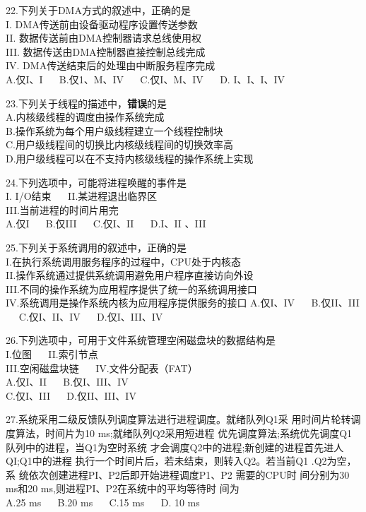 22.下列关于DMA方式的叙述中，正确的是 \\
I. DMA传送前由设备驱动程序设置传送参数 \\
II. 数据传送前由DMA控制器请求总线使用权 \\
III. 数据传送由DMA控制器直接控制总线完成 \\
IV. DMA传送结束后的处理由中断服务程序完成 \\
A.仅I、I $\quad$ B.仅1、M、IV $\quad$ C.仅I、M、IV $\quad$ D. I、I、I、IV

23.下列关于线程的描述中，\textbf{错误}的是 \\
A.内核级线程的调度由操作系统完成 \\
B.操作系统为每个用户级线程建立一个线程控制块 \\
C.用户级线程间的切换比内核级线程间的切换效率高 \\
D.用户级线程可以在不支持内核级线程的操作系统上实现

24.下列选项中，可能将进程唤醒的事件是 \\
I. I/O结束 $\quad$ II.某进程退出临界区 \\
III.当前进程的时间片用完 \\
A.仅I $\quad$ B.仅III $\quad$ C.仅I、II $\quad$ D.I、II 、III

25.下列关于系统调用的叙述中，正确的是 \\
I.在执行系统调用服务程序的过程中，CPU处于内核态 \\
II.操作系统通过提供系统调用避免用户程序直接访向外设 \\
III.不同的操作系统为应用程序提供了统一的系统调用接口 \\
IV.系统调用是操作系统内核为应用程序提供服务的接口
A.仅I、IV $\quad$ B.仅II、III $\quad$ C.仅I、II、IV $\quad$ D.仅I、III、IV

26.下列选项中，可用于文件系统管理空闲磁盘块的数据结构是 \\
I.位图  $\quad$ II.索引节点 \\
III.空闲磁盘块链 $\quad$ IV.文件分配表（FAT） \\
A.仅I、II $\quad$ B.仅I、III、IV \\
C.仅I、III $\quad$ D.仅II、III、IV

27.系统采用二级反馈队列调度算法进行进程调度。就绪队列Q1采
用时间片轮转调度算法，时间片为10 ms;就绪队列Q2采用短进程
优先调度算法;系统优先调度Q1队列中的进程，当Q1为空时系统
才会调度Q2中的进程;新创建的进程首先进人QI;Q1中的进程
执行一个时间片后，若未结束，则转入Q2。若当前Q1 .Q2为空，系
统依次创建进程PI、P2后即开始进程调度P1、P2 需要的CPU时
间分别为30 ms和20 ms,则进程PI、P2在系统中的平均等待时
间为 \\
A.25 ms $\quad$ B.20 ms $\quad$ C.15 ms $\quad$ D. 10 ms

